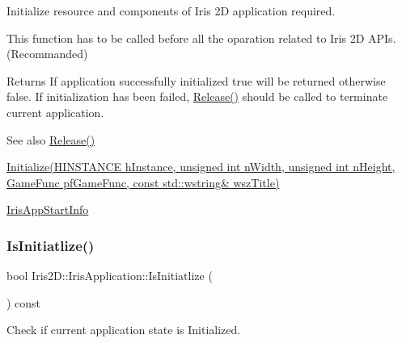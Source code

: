 Initialize resource and components of Iris 2D application required. 

This function has to be called before all the oparation related to Iris 2D A\+P\+Is. (Recommanded) \begin{DoxyReturn}{Returns}
If application successfully initialized true will be returned otherwise false. If initialization has been failed, \hyperlink{class_iris2_d_1_1_iris_application_a486d999a8d9e96f21b9d064d10d15b96}{Release()} should be called to terminate current application. 
\end{DoxyReturn}
\begin{DoxySeeAlso}{See also}
\hyperlink{class_iris2_d_1_1_iris_application_a486d999a8d9e96f21b9d064d10d15b96}{Release()} 

\hyperlink{class_iris2_d_1_1_iris_application_a84f3ddebb3a3ffb0c172bd41fb952e1a}{Initialize(\+H\+I\+N\+S\+T\+A\+N\+C\+E h\+Instance, unsigned int n\+Width, unsigned int n\+Height, Game\+Func pf\+Game\+Func, const std\+::wstring\& wsz\+Title)} 

\hyperlink{struct_iris2_d_1_1_iris_application_1_1_iris_app_start_info}{Iris\+App\+Start\+Info} 
\end{DoxySeeAlso}
\mbox{\label{class_iris2_d_1_1_iris_application_ab7a5b7f956f23d3fb3d2ee0de573cb53}} 
\subsubsection{\texorpdfstring{Is\+Initiatlize()}{IsInitiatlize()}}
{\footnotesize\ttfamily bool Iris2\+D\+::\+Iris\+Application\+::\+Is\+Initiatlize (\begin{DoxyParamCaption}{ }\end{DoxyParamCaption}) const}



Check if current application state is Initialized. 

